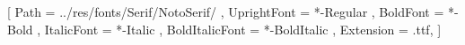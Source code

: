 \setmainfont{NotoSerif}
[
	Path = ../res/fonts/Serif/NotoSerif/ ,
	UprightFont = *-Regular ,
	BoldFont = *-Bold ,
	ItalicFont = *-Italic ,
	BoldItalicFont = *-BoldItalic ,
	Extension = .ttf,
]
